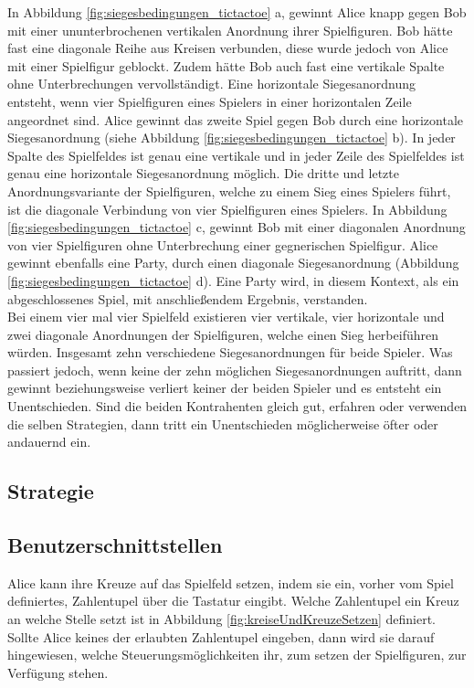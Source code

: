 In Abbildung \ref{fig:siegesbedingungen_tictactoe} a, gewinnt Alice knapp gegen Bob mit einer ununterbrochenen vertikalen Anordnung ihrer Spielfiguren. Bob hätte fast eine diagonale Reihe aus Kreisen verbunden, diese wurde jedoch von Alice mit einer Spielfigur geblockt. Zudem hätte Bob auch fast eine vertikale Spalte ohne Unterbrechungen vervollständigt. Eine horizontale Siegesanordnung entsteht, wenn vier Spielfiguren eines Spielers in einer horizontalen Zeile angeordnet sind. Alice gewinnt das zweite Spiel gegen Bob durch eine horizontale Siegesanordnung (siehe Abbildung \ref{fig:siegesbedingungen_tictactoe} b). In jeder Spalte des Spielfeldes ist genau eine vertikale und in jeder Zeile des Spielfeldes ist genau eine horizontale Siegesanordnung möglich. Die dritte und letzte Anordnungsvariante der Spielfiguren, welche zu einem Sieg eines Spielers führt, ist die diagonale Verbindung von vier Spielfiguren eines Spielers. In Abbildung  \ref{fig:siegesbedingungen_tictactoe} c, gewinnt Bob mit einer diagonalen Anordnung von vier Spielfiguren ohne Unterbrechung einer gegnerischen Spielfigur. Alice gewinnt ebenfalls eine Party, durch einen diagonale Siegesanordnung (Abbildung \ref{fig:siegesbedingungen_tictactoe} d). Eine Party wird, in diesem Kontext, als ein abgeschlossenes Spiel, mit anschließendem Ergebnis, verstanden. \\

Bei einem vier mal vier Spielfeld existieren vier vertikale, vier horizontale und zwei diagonale Anordnungen der Spielfiguren, welche einen Sieg herbeiführen würden. Insgesamt zehn verschiedene Siegesanordnungen für beide Spieler. Was passiert jedoch, wenn keine der zehn möglichen Siegesanordnungen auftritt, dann gewinnt beziehungsweise verliert keiner der beiden Spieler und es entsteht ein Unentschieden. Sind die beiden Kontrahenten gleich gut, erfahren oder verwenden die selben Strategien, dann tritt ein Unentschieden möglicherweise öfter oder andauernd ein.

\subsection{Strategie}



\subsection{Benutzerschnittstellen}

Alice kann ihre Kreuze auf das Spielfeld setzen, indem sie ein, vorher vom Spiel definiertes, Zahlentupel über die Tastatur eingibt. Welche Zahlentupel ein Kreuz an welche Stelle setzt ist in Abbildung \ref{fig:kreiseUndKreuzeSetzen} definiert. Sollte Alice keines der erlaubten Zahlentupel eingeben, dann wird sie darauf hingewiesen, welche Steuerungsmöglichkeiten ihr, zum setzen der Spielfiguren, zur Verfügung stehen.

